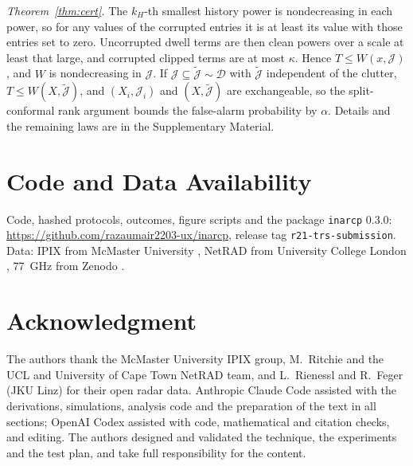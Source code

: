 \documentclass[journal]{IEEEtran}
\begin{document}
\emph{Theorem~\ref{thm:cert}.} The $k_H$-th smallest history power is nondecreasing in each power, so for any values of the corrupted entries it is at least its value with those entries set to zero. Uncorrupted dwell terms are then clean powers over a scale at least that large, and corrupted clipped terms are at most $\kappa$. Hence $T\le W(x,\mathcal J)$, and $W$ is nondecreasing in $\mathcal J$. If $\mathcal J\subseteq\tilde{\mathcal J}\sim\mathcal D$ with $\tilde{\mathcal J}$ independent of the clutter, $T\le W(X,\tilde{\mathcal J})$, and $(X_i,\mathcal J_i)$ and $(X,\tilde{\mathcal J})$ are exchangeable, so the split-conformal rank argument bounds the false-alarm probability by $\alpha$. Details and the remaining laws are in the Supplementary Material.

\section*{Code and Data Availability}
Code, hashed protocols, outcomes, figure scripts and the package \texttt{inarcp} 0.3.0: \url{https://github.com/razaumair2203-ux/inarcp}, release tag \texttt{r21-trs-submission}. Data: IPIX from McMaster University \cite{ipixweb}, NetRAD from University College London \cite{netrad2026}, 77~GHz from Zenodo \cite{jku2026}.

\section*{Acknowledgment}
The authors thank the McMaster University IPIX group, M.~Ritchie and the UCL and University of Cape Town NetRAD team, and L.~Rienessl and R.~Feger (JKU Linz) for their open radar data. Anthropic Claude Code assisted with the derivations, simulations, analysis code and the preparation of the text in all sections; OpenAI Codex assisted with code, mathematical and citation checks, and editing. The authors designed and validated the technique, the experiments and the test plan, and take full responsibility for the content.



\end{document}

